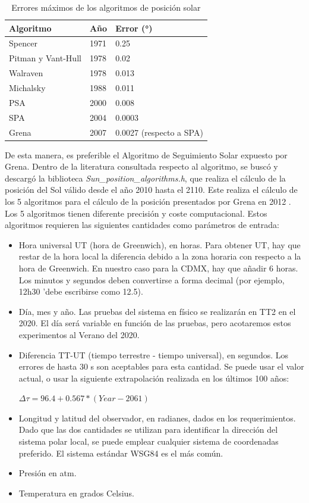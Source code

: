 \begin{table}[H]
	\centering
	\caption{Errores máximos de los algoritmos de posición solar \cite{DDC3}}
	\begin{tabular}{|l|l|l|}
		\hline
		\textbf{Algoritmo} & \textbf{Año} & \textbf{Error (°)} \\
		\hline \hline
		Spencer & 1971 & 0.25\\ \hline
		Pitman y Vant-Hull & 1978 & 0.02\\ \hline
		Walraven & 1978 & 0.013\\ \hline
		Michalsky & 1988 & 0.011\\ \hline
		PSA & 2000 & 0.008\\ \hline
		SPA & 2004 & 0.0003\\ \hline
		Grena & 2007 & 0.0027 (respecto a SPA)\\ \hline
	\end{tabular}
	\label{tabla:algoritmos}
\end{table}

De esta manera, es preferible el Algoritmo de Seguimiento Solar expuesto por Grena. Dentro de la literatura consultada respecto al algoritmo, se buscó y descargó la biblioteca \textit{Sun\_position\_algorithms.h}, que realiza el cálculo de la posición del Sol válido desde el año 2010 hasta el 2110. Este realiza el cálculo de los 5 algoritmos para el cálculo de la posición presentados por Grena en 2012 \cite{DDC8}.\\

Los 5 algoritmos tienen diferente precisión y coste computacional. Estos algoritmos requieren las siguientes cantidades como parámetros de entrada:
\begin{itemize}
	\item Hora universal UT (hora de Greenwich), en horas. Para obtener UT, hay que restar de la hora local la diferencia debido a la zona horaria con respecto a la hora de Greenwich. En nuestro caso para la CDMX, hay que añadir 6 horas. Los minutos y segundos deben convertirse a forma decimal (por ejemplo, 12h30 'debe escribirse como 12.5).
	\item Día, mes y año. Las pruebas del sistema en físico se realizarán en TT2 en el 2020. El día será variable en función de las pruebas, pero acotaremos estos experimentos al Verano del 2020.
	\item Diferencia TT-UT (tiempo terrestre - tiempo universal), en segundos. Los errores de hasta 30 s son aceptables para esta cantidad. Se puede usar el valor actual, o usar la siguiente extrapolación realizada en los últimos 100 años:
	\begin{center}
		$\Delta\tau=96.4+0.567*(Year-2061)$
	\end{center}
	\item Longitud y latitud del observador, en radianes, dados en los requerimientos. Dado que las dos cantidades se utilizan para identificar la dirección del sistema polar local, se puede emplear cualquier sistema de coordenadas preferido. El sistema estándar WSG84 es el más común.
	\item Presión en atm.
	\item Temperatura en grados Celsius.
\end{itemize}

